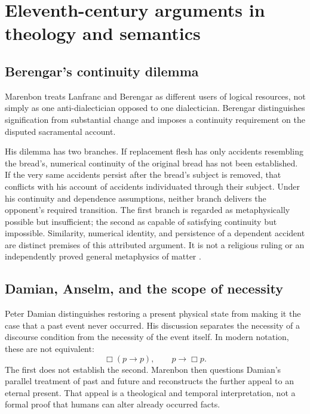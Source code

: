 \section{Eleventh-century arguments in theology and semantics}
\label{sec:p13-early-latin-eleventh}

\subsection{Berengar's continuity dilemma}

Marenbon treats Lanfranc and Berengar as different users of logical
resources, not simply as one anti-dialectician opposed to one
dialectician. Berengar distinguishes signification from substantial
change and imposes a continuity requirement on the disputed
sacramental account.

His dilemma has two branches. If replacement flesh has only accidents
resembling the bread's, numerical continuity of the original bread
has not been established. If the very same accidents persist after
the bread's subject is removed, that conflicts with his account
of accidents individuated through their subject.
Under his continuity and dependence assumptions, neither branch
delivers the opponent's required transition.
The first branch is regarded as metaphysically possible but insufficient;
the second as capable of satisfying continuity but impossible.
Similarity, numerical identity, and persistence of a dependent
accident are distinct premises of this attributed argument.
It is not a religious ruling or an independently proved general
metaphysics of matter \cite[pp.~43--45]{Marenbon2007FordhamEarlyLatin}.

\subsection{Damian, Anselm, and the scope of necessity}

Peter Damian distinguishes restoring a present physical state from
making it the case that a past event never occurred.
His discussion separates the necessity of a discourse condition
from the necessity of the event itself. In modern notation, these
are not equivalent:
\[
 \Box(p\to p),\qquad p\to\Box p.
\]
The first does not establish the second.
Marenbon then questions Damian's parallel treatment of past and future
and reconstructs the further appeal to an eternal present.
That appeal is a theological and temporal interpretation, not
a formal proof that humans can alter already occurred facts.

